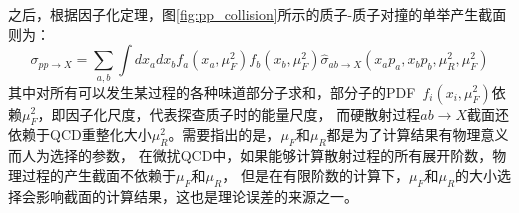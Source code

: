 之后，根据因子化定理\cite{Collins:1989gx}，图\ref{fig:pp_collision}所示的质子-质子对撞的单举产生截面则为：
\begin{equation}
 \sigma_{pp\rightarrow X}=\sum_{a,b}\int dx_adx_bf_a(x_a,\mu_F^2)f_b(x_b,\mu_F^2)\hat{\sigma}_{ab\rightarrow X}(x_ap_a,x_bp_b,\mu_R^2,\mu_F^2)
\end{equation}
其中对所有可以发生某过程的各种味道部分子求和，部分子的PDF~$f_i(x_i,\mu_F^2)$依赖$\mu_F^2$，即因子化尺度，代表探查质子时的能量尺度，
而硬散射过程$ab\rightarrow X$截面还依赖于QCD重整化大小$\mu_R^2$。需要指出的是，$\mu_F$和$\mu_R$都是为了计算结果有物理意义而人为选择的参数，
在微扰QCD中，如果能够计算散射过程的所有展开阶数，物理过程的产生截面不依赖于$\mu_F$和$\mu_R$，
但是在有限阶数的计算下，$\mu_F$和$\mu_R$的大小选择会影响截面的计算结果，这也是理论误差的来源之一。
